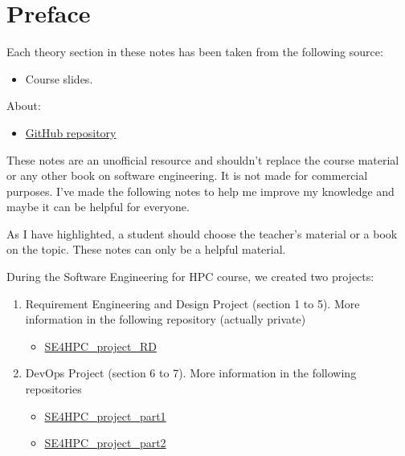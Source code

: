 \section*{Preface}

Each theory section in these notes has been taken from the following source:
\begin{itemize}
    \item Course slides.\cite{slides}
\end{itemize}
About:
\begin{itemize}
    \item[\faIcon{github}] \href{https://github.com/PoliMI-HPC-E-notes-projects-AndreVale69/HPC-E-PoliMI-university-notes}{GitHub repository}
\end{itemize}
These notes are an unofficial resource and shouldn't replace the course material or any other book on software engineering. It is not made for commercial purposes. I've made the following notes to help me improve my knowledge and maybe it can be helpful for everyone.

As I have highlighted, a student should choose the teacher's material or a book on the topic. These notes can only be a helpful material.

\highspace
During the Software Engineering for HPC course, we created two projects:
\begin{enumerate}
    \item Requirement Engineering and Design Project (section 1 to 5). More information in the following repository (actually private)
    \begin{itemize}
        \item {} \href{https://github.com/PoliMI-HPC-E-notes-projects-AndreVale69/SE4HPC_project_RD}{SE4HPC\_project\_RD}
    \end{itemize}
    
    \item DevOps Project (section 6 to 7). More information in the following repositories
    \begin{itemize}
        \item {} \href{https://github.com/AndreVale69/SE4HPC_project_part1}{SE4HPC\_project\_part1}

        \item {} \href{https://github.com/AndreVale69/SE4HPC_project_part2}{SE4HPC\_project\_part2}
    \end{itemize}
\end{enumerate}